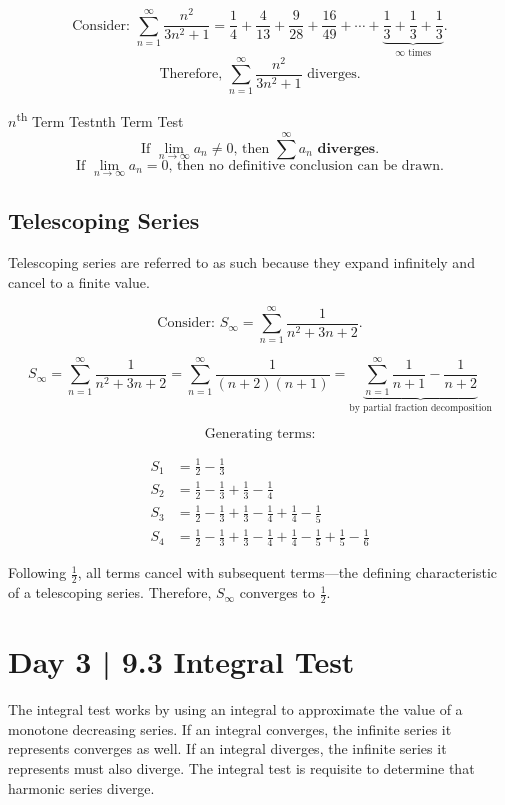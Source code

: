 \documentclass{article}
\theoremstyle{definition}
\begin{document}
\[\text{Consider: } \sum_{n=1}^{\infty} \frac{n^2}{3n^2+1}=\frac{1}{4}+\frac{4}{13}+\frac{9}{28}+\frac{16}{49}+\cdots + \underbrace{\frac{1}{3}+\frac{1}{3}+\frac{1}{3}}_{\infty \text{ times}}.\]
\[\text{Therefore, } \sum_{n=1}^{\infty} \frac{n^2}{3n^2+1} \text{ diverges.}\]

\begin{theorem}{$n$\textsuperscript{th} Term Test}{nth Term Test}
    \[\text{If } \lim_{n \to \infty} a_n \not= 0 \text{, then } \sum^{\infty} a_n \textbf{ diverges.}\]
    \[\text{If } \lim_{n \to \infty} a_n     = 0 \text{, then no definitive conclusion can be drawn.}\]
\end{theorem}

\subsection{Telescoping Series}
Telescoping series are referred to as such because they expand infinitely and cancel to a finite value.




\[\text{Consider: } S_\infty=\sum_{n=1}^{\infty} \frac{1}{n^2+3n+2}.\]

\[S_\infty = \sum_{n=1}^{\infty} \frac{1}{n^2+3n+2} = \sum_{n=1}^{\infty} \frac{1}{(n+2)(n+1)}=\underbrace{\sum_{n=1}^{\infty} \frac{1}{n+1}-\frac{1}{n+2}}_{\text{by partial fraction decomposition}}\]


\newpage

\[\text{Generating terms:}\]

\begin{equation*}
\begin{split}
    S_1&=\frac{1}{2}-\frac{1}{3} \\
    S_2&=\frac{1}{2}-\frac{1}{3}+\frac{1}{3}-\frac{1}{4} \\
    S_3&=\frac{1}{2}-\frac{1}{3}+\frac{1}{3}-\frac{1}{4}+\frac{1}{4}-\frac{1}{5} \\
    S_4&=\frac{1}{2}-\frac{1}{3}+\frac{1}{3}-\frac{1}{4}+\frac{1}{4}-\frac{1}{5}+\frac{1}{5}-\frac{1}{6}
\end{split}
\end{equation*}

Following $\frac{1}{2}$, all terms cancel with subsequent terms---the defining characteristic of a telescoping series. Therefore, $S_\infty$ converges to $\frac{1}{2}$.



\section{Day 3 | 9.3 Integral Test}
The integral test works by using an integral to approximate the value of a monotone decreasing series. If an integral converges, the infinite series it represents converges as well. If an integral diverges, the infinite series it represents must also diverge. The integral test is requisite to determine that harmonic series diverge.
\end{document}
